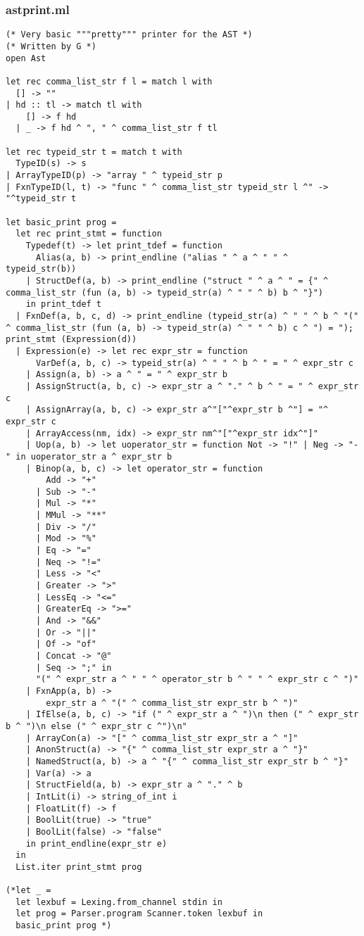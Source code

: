 \documentclass[main.tex]{subfiles}
\begin{document}
\subsubsection{astprint.ml}
\begin{lstlisting}
(* Very basic """pretty""" printer for the AST *)
(* Written by G *)
open Ast

let rec comma_list_str f l = match l with
  [] -> ""
| hd :: tl -> match tl with
    [] -> f hd
  | _ -> f hd ^ ", " ^ comma_list_str f tl

let rec typeid_str t = match t with
  TypeID(s) -> s
| ArrayTypeID(p) -> "array " ^ typeid_str p
| FxnTypeID(l, t) -> "func " ^ comma_list_str typeid_str l ^" -> "^typeid_str t

let basic_print prog = 
  let rec print_stmt = function
    Typedef(t) -> let print_tdef = function
      Alias(a, b) -> print_endline ("alias " ^ a ^ " " ^ typeid_str(b))
    | StructDef(a, b) -> print_endline ("struct " ^ a ^ " = {" ^ comma_list_str (fun (a, b) -> typeid_str(a) ^ " " ^ b) b ^ "}")
    in print_tdef t
  | FxnDef(a, b, c, d) -> print_endline (typeid_str(a) ^ " " ^ b ^ "(" ^ comma_list_str (fun (a, b) -> typeid_str(a) ^ " " ^ b) c ^ ") = "); print_stmt (Expression(d))
  | Expression(e) -> let rec expr_str = function
      VarDef(a, b, c) -> typeid_str(a) ^ " " ^ b ^ " = " ^ expr_str c
    | Assign(a, b) -> a ^ " = " ^ expr_str b
    | AssignStruct(a, b, c) -> expr_str a ^ "." ^ b ^ " = " ^ expr_str c
    | AssignArray(a, b, c) -> expr_str a^"["^expr_str b ^"] = "^ expr_str c
    | ArrayAccess(nm, idx) -> expr_str nm^"["^expr_str idx^"]"
    | Uop(a, b) -> let uoperator_str = function Not -> "!" | Neg -> "-" in uoperator_str a ^ expr_str b
    | Binop(a, b, c) -> let operator_str = function
        Add -> "+"
      | Sub -> "-"
      | Mul -> "*"
      | MMul -> "**"
      | Div -> "/"
      | Mod -> "%"
      | Eq -> "="
      | Neq -> "!="
      | Less -> "<"
      | Greater -> ">"
      | LessEq -> "<="
      | GreaterEq -> ">="
      | And -> "&&"
      | Or -> "||"
      | Of -> "of"
      | Concat -> "@"
      | Seq -> ";" in
      "(" ^ expr_str a ^ " " ^ operator_str b ^ " " ^ expr_str c ^ ")"
    | FxnApp(a, b) -> 
        expr_str a ^ "(" ^ comma_list_str expr_str b ^ ")"
    | IfElse(a, b, c) -> "if (" ^ expr_str a ^ ")\n then (" ^ expr_str b ^ ")\n else (" ^ expr_str c ^")\n"
    | ArrayCon(a) -> "[" ^ comma_list_str expr_str a ^ "]"
    | AnonStruct(a) -> "{" ^ comma_list_str expr_str a ^ "}"
    | NamedStruct(a, b) -> a ^ "{" ^ comma_list_str expr_str b ^ "}"
    | Var(a) -> a
    | StructField(a, b) -> expr_str a ^ "." ^ b
    | IntLit(i) -> string_of_int i
    | FloatLit(f) -> f
    | BoolLit(true) -> "true"
    | BoolLit(false) -> "false"
    in print_endline(expr_str e)
  in
  List.iter print_stmt prog

(*let _ =
  let lexbuf = Lexing.from_channel stdin in
  let prog = Parser.program Scanner.token lexbuf in
  basic_print prog *)
\end{lstlisting}
\end{document}
